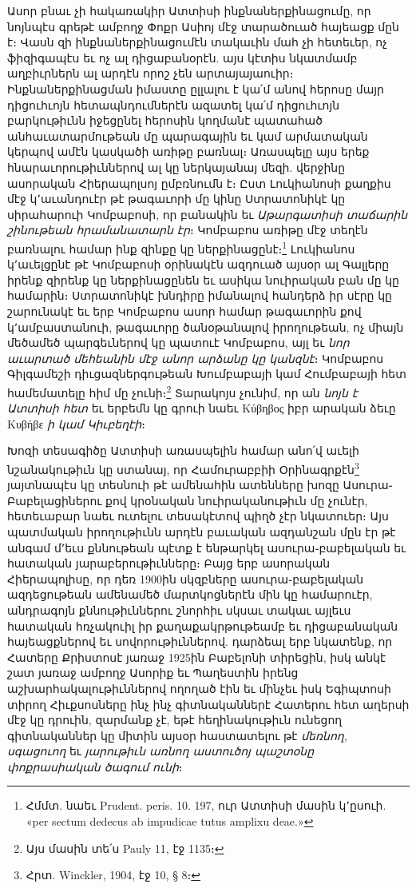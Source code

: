 \documentclass{article}
\begin{document}
{Ասոր բնաւ չի հակառակիր Ատտիսի ինքնաներքինացումը, որ նոյնպէս գրեթէ ամբողջ Փոքր Ասիոյ մէջ տարածուած հայեացք մըն է։ Վասն զի ինքնաներքինացումէն տակաւին մահ չի հետեւեր, ոչ ֆիզիգապէս եւ ոչ ալ դիցաբանօրէն. այս կէտիս նկատմամբ աղբիւրներն ալ արդէն որոշ չեն արտայայաուիր։ Ինքնաներքինացման իմաստը ըլլալու է կա՛մ անով հերոսը մայր դիցուհւոյն հետապնդումներէն ազատել կա՛մ դիցուհւոյն բարկութիւնն իջեցընել հերոսին կողմանէ պատահած անհաւատարմութեան մը պարագային եւ կամ արմատական կերպով ամէն կասկածի առիթը բառնալ։ Առասպելը այս երեք հնարաւորութիւններով ալ կը ներկայանայ մեզի. վերջինը ասորական Հիերապոլսոյ ըմբռնումն է։ Ըստ Լուկիանոսի քաղքիս մէջ կ՚աւանդուէր թէ թագաւորի մը կինը Ստրատոնիկէ կը սիրահարուի Կոմբաբոսի, որ բանակին եւ \emph{Աթարգատիսի տաճարին շինութեան հրամանատարն էր}։ Կոմբաբոս առիթը մէջ տեղէն բառնալու համար ինք զինքը կը ներքինացընէ։\footnote{Հմմտ. նաեւ Prudent. peris. 10. 197, ուր Ատտիսի մասին կ՚ըսուի. «per sectum dedecus ab impudicae tutus amplixu deae.»} Լուկիանոս կ՚աւելցընէ թէ Կոմբաբոսի օրինակէն ազդուած այսօր ալ Գալլերը իրենք զիրենք կը ներքինացընեն եւ ասիկա նուիրական բան մը կը համարին։ Ստրատոնիկէ խնդիրը իմանալով հանդերձ իր սէրը կը շարունակէ եւ երբ Կոմբաբոս ասոր համար թագաւորին քով կ՚ամբաստանուի, թագաւորը ծանօթանալով իրողութեան, ոչ միայն մեծամեծ պարգեւներով կը պատուէ Կոմբաբոս, այլ եւ \emph{նոր աւարտած մեհեանին մէջ անոր արձանը կը կանզնէ}։ Կոմբաբոս Գիլգամեշի դիւցազներգութեան Խումբաբայի կամ Հումբաբայի հետ համեմատելը հիմ մը չունի։\footnote{Այս մասին տե՛ս Pauly 11, էջ 1135։} Տարակոյս չունիմ, որ ան \emph{նոյն է Ատտիսի հետ} եւ երբեմն կը գրուի նաեւ Κύβηβος իբր արական ձեւը Κυβήβε \emph{ի կամ Կիւբեղէի}։

Խոզի տեսագիծը Ատտիսի առասպելին համար անո՛վ աւելի նշանակութիւն կը ստանայ, որ Համուրաբբիի Օրինագրքէն\footnote{Հրտ. Winckler, 1904, էջ 10, § 8։} յայտնապէս կը տեսնուի թէ ամենահին ատենները խոզը Ասուրա֊Բաբելացիներու քով կրօնական նուիրականութիւն մը չունէր, հետեւաբար նաեւ ուտելու տեսակէտով պիղծ չէր նկատուեր։ Այս պատմական իրողութիւնն արդէն բաւական ազդանշան մըն էր թէ անգամ մ՚եւս քննութեան պէտք է ենթարկել ասուրա֊բաբելական եւ հատական յարաբերութիւնները։ Բայց երբ ասորական Հիերապոլիսը, որ դեռ 1900ին սկզբները ասուրա֊բաբելական ազդեցութեան ամենամեծ մարտկոցներէն մին կը համարուէր, անդրագոյն քննութիւններու շնորհիւ սկսաւ տակաւ այլեւս հատական հռչակուիլ իր քաղաքակրթութեամբ եւ դիցաբանական հայեացքներով եւ սովորութիւններով. դարձեալ երբ նկատենք, որ Հատերը Քրիստոսէ յառաջ 1925ին Բաբելոնի տիրեցին, իսկ անկէ շատ յառաջ ամբողջ Ասորիք եւ Պաղեստին իրենց աշխարհակալութիւններով ողողած էին եւ մինչեւ իսկ Եգիպտոսի տիրող Հիւքսոսները ինչ ինչ գիտնականներէ Հատերու հետ աղերսի մէջ կը դրուին, զարմանք չէ, եթէ հեղինակութիւն ունեցող գիտնականներ կը միտին այսօր հաստատելու թէ \emph{մեռնող, սգացուող} եւ \emph{յարութիւն առնող աստուծոյ պաշտօնը փոքրասիական ծագում ունի}։

}
\end{document}

